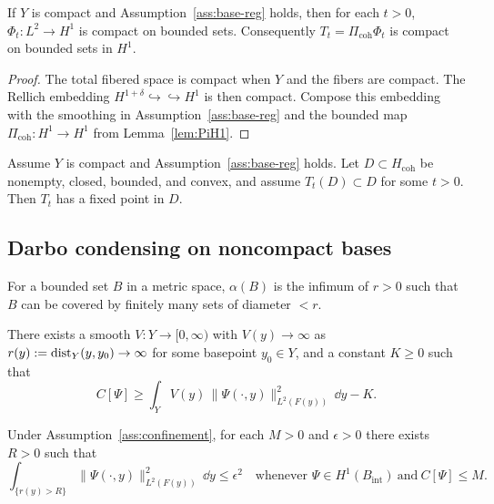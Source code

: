 \documentclass[11pt]{article}
\providecommand{\Bint}{B_{\mathrm{int}}}
\providecommand{\PiCoh}{\Pi_{\mathrm{coh}}}
\providecommand{\Hcoh}{H_{\mathrm{coh}}}
\begin{document}
\begin{lemma}\label{lem:compact}
If $Y$ is compact and Assumption~\ref{ass:base-reg} holds, then for each $t>0$,
$\Phi_t:L^2\to H^1$ is compact on bounded sets. Consequently
$T_t=\PiCoh\Phi_t$ is compact on bounded sets in $H^1$.
\end{lemma}

\begin{proof}
The total fibered space is compact when $Y$ and the fibers are compact. The
Rellich embedding $H^{1+\delta}\hookrightarrow\!\hookrightarrow H^1$ is then
compact. Compose this embedding with the smoothing in
Assumption~\ref{ass:base-reg} and the bounded map
$\PiCoh:H^1\to H^1$ from Lemma~\ref{lem:PiH1}.
\end{proof}

\begin{theorem}\label{thm:schauder}
Assume $Y$ is compact and Assumption~\ref{ass:base-reg} holds. Let $D\subset \Hcoh$ be nonempty, closed, bounded, and convex, and assume $T_t(D)\subset D$ for some $t>0$.
Then $T_t$ has a fixed point in $D$.
\end{theorem}

\subsection{Darbo condensing on noncompact bases}

\begin{definition}
For a bounded set $B$ in a metric space, $\alpha(B)$ is the infimum of $r>0$ such that $B$ can be covered by finitely many sets of diameter $<r$.
\end{definition}

\begin{assumption}[Confinement]\label{ass:confinement}
There exists a smooth $V:Y\to[0,\infty)$ with $V(y)\to\infty$ as $r(y):=\operatorname{dist}_Y(y,y_0)\to\infty$ for some basepoint $y_0\in Y$, and a constant $K\ge 0$ such that
\[
C[\Psi]\ge \int_Y V(y)\,\|\Psi(\cdot,y)\|_{L^2(F(y))}^2\,\dd y - K.
\]
\end{assumption}

\begin{lemma}\label{lem:tails}
Under Assumption~\ref{ass:confinement}, for each $M>0$ and $\epsilon>0$ there exists $R>0$ such that
\[
\int_{\{r(y)>R\}} \|\Psi(\cdot,y)\|_{L^2(F(y))}^2\,\dd y \le \epsilon^2
\quad\text{whenever } \Psi\in H^1(\Bint)\ \text{and}\ C[\Psi]\le M.
\]
\end{lemma}
\end{document}
